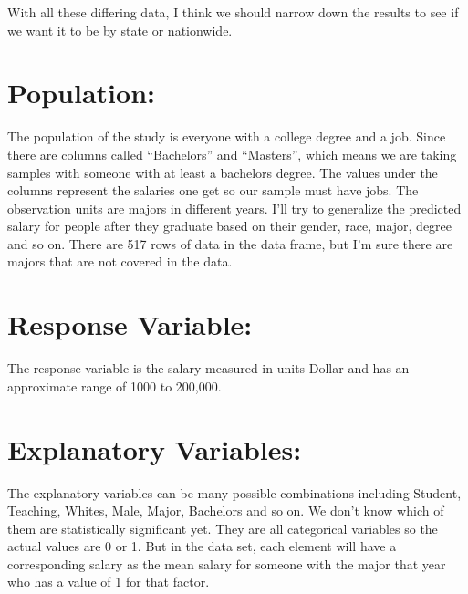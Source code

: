\documentclass[]{article}
\begin{document}
With all these differing data, I think we should narrow down the results
to see if we want it to be by state or nationwide.

\section{Population:}\label{population}

The population of the study is everyone with a college degree and a job.
Since there are columns called ``Bachelors'' and ``Masters'', which
means we are taking samples with someone with at least a bachelors
degree. The values under the columns represent the salaries one get so
our sample must have jobs. The observation units are majors in different
years. I'll try to generalize the predicted salary for people after they
graduate based on their gender, race, major, degree and so on. There are
517 rows of data in the data frame, but I'm sure there are majors that
are not covered in the data.

\section{Response Variable:}\label{response-variable}

The response variable is the salary measured in units Dollar and has an
approximate range of 1000 to 200,000.

\section{Explanatory Variables:}\label{explanatory-variables}

The explanatory variables can be many possible combinations including
Student, Teaching, Whites, Male, Major, Bachelors and so on. We don't
know which of them are statistically significant yet. They are all
categorical variables so the actual values are 0 or 1. But in the data
set, each element will have a corresponding salary as the mean salary
for someone with the major that year who has a value of 1 for that
factor.
\end{document}

